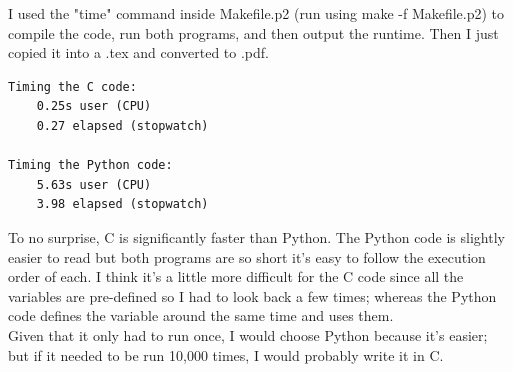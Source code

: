 \documentclass{article}
\begin{document}
\noindent I used the "time" command inside Makefile.p2 (run using make -f Makefile.p2) to compile the code, run both programs, and then output the runtime. Then I just copied it into a .tex and converted to .pdf.

\begin{Verbatim}[fontsize=\small,fontfamily=helvet]
Timing the C code:
	0.25s user (CPU)
	0.27 elapsed (stopwatch)

Timing the Python code:
	5.63s user (CPU)
	3.98 elapsed (stopwatch)
\end{Verbatim}
To no surprise, C is significantly faster than Python. The Python code is slightly easier to read but both programs are so short it's easy to follow the execution order of each. I think it's a little more difficult for the C code since all the variables are pre-defined so I had to look back a few times; whereas the Python code defines the variable around the same time and uses them.\\

\noindent Given that it only had to run once, I would choose Python because it’s easier; but if it needed to be run 10,000 times, I would probably write it in C.
\end{document}
